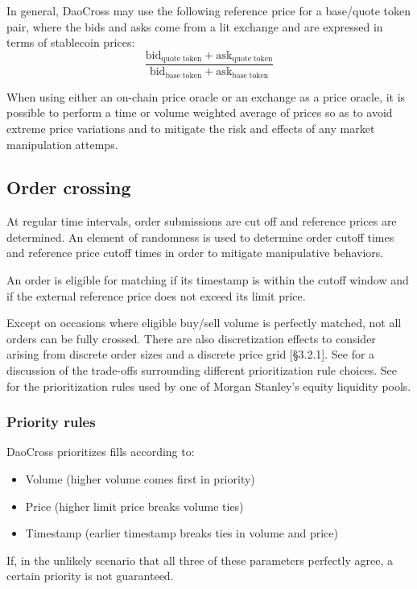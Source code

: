 \documentclass[11pt, reqno]{amsart}
\theoremstyle{definition}
\theoremstyle{remark}
\newcommand{\bidbase}{\mathrm{bid}_\mathrm{quote\;token}}
\newcommand{\askbase}{\mathrm{ask}_\mathrm{quote\;token}}
\newcommand{\bidquote}{\mathrm{bid}_\mathrm{base\;token}}
\newcommand{\askquote}{\mathrm{ask}_\mathrm{base\;token}}
\begin{document}
In general, DaoCross may use the following reference price for a base/quote
token pair, where the bids and asks come from a lit exchange and are expressed
in terms of stablecoin prices:
\begin{equation}
	\frac{\bidbase + \askbase}{\bidquote + \askquote}
\end{equation}

When using either an on-chain price oracle or an exchange as a price oracle,
it is possible to perform a time or volume weighted average of prices so as
to avoid extreme price variations and to mitigate the risk and effects of any
market manipulation attemps.

\subsection{Order crossing}
At regular time intervals, order submissions are cut off and reference prices
are determined. An element of randomness is used to determine order cutoff
times and reference price cutoff times in order to
mitigate manipulative behaviors.

An order is eligible for matching if its timestamp is within the cutoff window
and if the external reference price does not exceed its limit price.

Except on occasions where eligible buy/sell volume is perfectly matched, not
all orders can be fully crossed. There are also discretization effects to
consider arising from discrete order sizes and a discrete price grid
\cite{BoBoDoGo18}[\S 3.2.1].
See \cite{BeLaLiVa22} for a discussion of the trade-offs surrounding
different prioritization rule choices. See \cite{MsAts} for the
prioritization rules used by one of Morgan Stanley's equity liquidity pools.

\subsubsection{Priority rules}
DaoCross prioritizes fills according to:
\begin{itemize}
	\item Volume (higher volume comes first in priority)
	\item Price (higher limit price breaks volume ties)
	\item Timestamp (earlier timestamp breaks ties in volume and price)
\end{itemize}
If, in the unlikely scenario that all three of these parameters perfectly
agree, a certain priority is not guaranteed.
\end{document}
